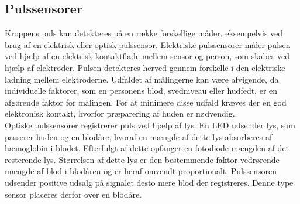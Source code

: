 \subsection{Pulssensorer}\label{sec:pulssensor}
Kroppens puls kan detekteres på en række forskellige måder, eksempelvis ved brug af en elektrisk eller optisk pulssensor. Elektriske pulssensorer måler pulsen ved hjælp af en elektrisk kontaktflade mellem sensor og person, som skabes ved hjælp af elektroder. Pulsen detekteres herved gennem forskelle i den elektriske ladning mellem elektroderne. Udfaldet af målingerne kan være afvigende, da individuelle faktorer, som en personens blod, svedniveau eller hudfedt, er en afgørende faktor for målingen. For at minimere disse udfald kræves der en god elektronisk kontakt, hvorfor præparering af huden er nødvendig.. \citep{PhuaLissorguesMercier2009}  \\
Optiske pulssensorer registrerer puls ved hjælp af lys. En LED udsender lys, som passerer huden og en blodåre, hvoraf en mængde af dette lys absorberes af hæmoglobin i blodet. Efterfulgt af dette opfanger en fotodiode mængden af det resterende lys. Størrelsen af dette lys er den bestemmende faktor vedrørende mængde af blod i blodåren og er heraf omvendt proportionalt. Pulssensoren udsender positive udsalg på signalet desto mere blod der registreres. Denne type sensor placeres derfor over en blodåre. \citep{PhuaLissorguesMercier2009,SrinivasReddySrinivas2006} 

